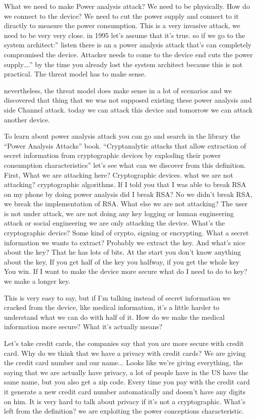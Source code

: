 What we need to make Power analysis attack? We need to be physically. 
How do we connect to the device? We need to cut the power supply and connect to it diractly to measure the power consumption.
This is a very invasive attack, we need to be very very close. in 1995 let's assume that it's true. so if we go to the system architect:” listen there is an a power analysis attack that's can completely compromised the device. Attacker needs to come to the device end cuts the power supply….” by the time you already lost the system architect because this is not practical. The threat model has to make sense.
 
nevertheless, the threat model does make sense in a lot of scenarios and we discovered that thing that we was not supposed existing these power analysis and side Channel attack.
today we can attack this device and tomorrow we can attack another device.

To learn about power analysis attack you can go and search in the library the “Power Analysis Attacks” book.
“Cryptanalytic attacks that allow extraction of secret information from cryptographic devices by exploding their power consumption characteristics”
 let's see what can we discover from this definition.
First, What we are attacking here? Cryptographic devices. what we are not attacking? cryptographic algorithms. If I told you that I was able to break RSA on my phone by doing power analysis did I break RSA? No we didn't break RSA, we break the implementation of RSA. 
What else we are not attacking? The user is not under attack, we are not doing any key logging or human engineering attack or social engineering we are only attacking the device.
What's the cryptographic device? Some kind of crypto, signing or encrypting.
What a secret information we wants to extract? Probably we extract the key.
And what's nice about the key? That he has lots of bits. At the start you don't know anything about the key, If you get half of the key you halfway, if you get the whole key You win. If I want to make the device more secure what do I need to do to key? we make a longer key.

This is very easy to say, but if I'm talking instead of secret information we cracked from the device, like medical information, it's a little harder to understand what we can do with half of it. How do we make the medical information more secure? What it's actually means?

Let's take credit cards, the companies say that you are more secure with credit card. Why do we think that we have a privacy with credit cards? We are giving the credit card number and our name... Looks like we're giving everything, the saying that we are actually have privacy, a lot of people have in the US have the same name, but you also get a zip code. Every time you pay with the credit card it generate a new credit card number automatically and doesn't have any digits on him. 
It is very hard to talk about privacy if it's not a cryptographic.
What's left from the definition? we are exploiting the power conceptions characteristic.


